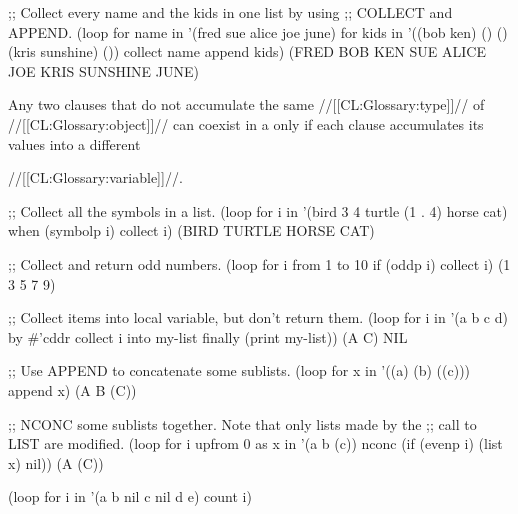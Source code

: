 \code
;; Collect every name and the kids in one list by using 
;; COLLECT and APPEND.
 (loop for name in '(fred sue alice joe june)
       for kids in '((bob ken) () () (kris sunshine) ())
       collect name
       append kids)
\EV (FRED BOB KEN SUE ALICE JOE KRIS SUNSHINE JUNE)
\endcode
 


Any two
clauses that do not accumulate the same //[[CL:Glossary:type]]// of 
//[[CL:Glossary:object]]// 
can coexist in a  only 
if each clause accumulates its values into 
a different


//[[CL:Glossary:variable]]//.  


















 

\code
;; Collect all the symbols in a list.
 (loop for i in '(bird 3 4 turtle (1 . 4) horse cat)
       when (symbolp i) collect i)
\EV (BIRD TURTLE HORSE CAT)
 
;; Collect and return odd numbers.
 (loop for i from 1 to 10
       if (oddp i) collect i)
\EV (1 3 5 7 9)
 
;; Collect items into local variable, but don't return them.
 (loop for i in '(a b c d) by #'cddr
       collect i into my-list
       finally (print my-list))
\OUT (A C) 
\EV NIL
\endcode
 
\endsubsubsection%


\code
;; Use APPEND to concatenate some sublists.
  (loop for x in '((a) (b) ((c)))
        append x)
\EV (A B (C))
 
;; NCONC some sublists together.  Note that only lists made by the
;; call to LIST are modified.
  (loop for i upfrom 0 
        as x in '(a b (c))
        nconc (if (evenp i) (list x) nil))
\EV (A (C))
\endcode

\endsubsubsection%


\code
 (loop for i in '(a b nil c nil d e)
       count i)
\endcode
 
